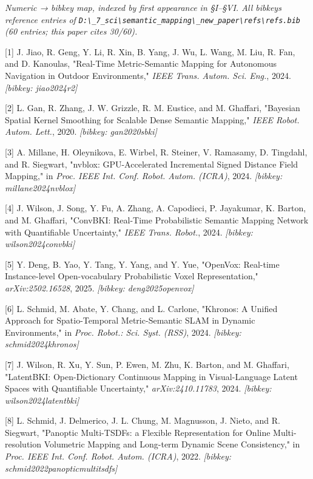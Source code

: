 \documentclass[
]{article}
\begin{document}
\emph{Numeric → bibkey map, indexed by first appearance in §I--§VI. All
bibkeys reference entries of
\texttt{D:\textbackslash{}\_7\_sci\textbackslash{}semantic\_mapping\textbackslash{}\_new\_paper\textbackslash{}refs\textbackslash{}refs.bib}
(60 entries; this paper cites 30/60).}

{[}1{]} J. Jiao, R. Geng, Y. Li, R. Xin, B. Yang, J. Wu, L. Wang, M.
Liu, R. Fan, and D. Kanoulas, "Real-Time Metric-Semantic Mapping for
Autonomous Navigation in Outdoor Environments," \emph{IEEE Trans. Autom.
Sci. Eng.}, 2024. \emph{{[}bibkey: jiao2024r2{]}}

{[}2{]} L. Gan, R. Zhang, J. W. Grizzle, R. M. Eustice, and M. Ghaffari,
"Bayesian Spatial Kernel Smoothing for Scalable Dense Semantic Mapping,"
\emph{IEEE Robot. Autom. Lett.}, 2020. \emph{{[}bibkey: gan2020sbki{]}}

{[}3{]} A. Millane, H. Oleynikova, E. Wirbel, R. Steiner, V. Ramasamy,
D. Tingdahl, and R. Siegwart, "nvblox: GPU-Accelerated Incremental
Signed Distance Field Mapping," in \emph{Proc. IEEE Int. Conf. Robot.
Autom. (ICRA)}, 2024. \emph{{[}bibkey: millane2024nvblox{]}}

{[}4{]} J. Wilson, J. Song, Y. Fu, A. Zhang, A. Capodieci, P. Jayakumar,
K. Barton, and M. Ghaffari, "ConvBKI: Real-Time Probabilistic Semantic
Mapping Network with Quantifiable Uncertainty," \emph{IEEE Trans.
Robot.}, 2024. \emph{{[}bibkey: wilson2024convbki{]}}

{[}5{]} Y. Deng, B. Yao, Y. Tang, Y. Yang, and Y. Yue, "OpenVox:
Real-time Instance-level Open-vocabulary Probabilistic Voxel
Representation," \emph{arXiv:2502.16528}, 2025. \emph{{[}bibkey:
deng2025openvox{]}}

{[}6{]} L. Schmid, M. Abate, Y. Chang, and L. Carlone, "Khronos: A
Unified Approach for Spatio-Temporal Metric-Semantic SLAM in Dynamic
Environments," in \emph{Proc. Robot.: Sci. Syst. (RSS)}, 2024.
\emph{{[}bibkey: schmid2024khronos{]}}

{[}7{]} J. Wilson, R. Xu, Y. Sun, P. Ewen, M. Zhu, K. Barton, and M.
Ghaffari, "LatentBKI: Open-Dictionary Continuous Mapping in
Visual-Language Latent Spaces with Quantifiable Uncertainty,"
\emph{arXiv:2410.11783}, 2024. \emph{{[}bibkey: wilson2024latentbki{]}}

{[}8{]} L. Schmid, J. Delmerico, J. L. Chung, M. Magnusson, J. Nieto,
and R. Siegwart, "Panoptic Multi-TSDFs: a Flexible Representation for
Online Multi-resolution Volumetric Mapping and Long-term Dynamic Scene
Consistency," in \emph{Proc. IEEE Int. Conf. Robot. Autom. (ICRA)},
2022. \emph{{[}bibkey: schmid2022panopticmultitsdfs{]}}
\end{document}
